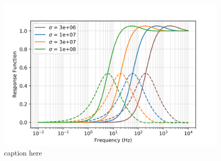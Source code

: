 \begin{figure}
    \begin{center}
    \includegraphics[width=0.6\columnwidth]{figures/casing_software/augustin_response_function_sigma.png}
    \end{center}
\caption{caption here}
\label{fig:augustin_response_function_sigma}
\end{figure}
